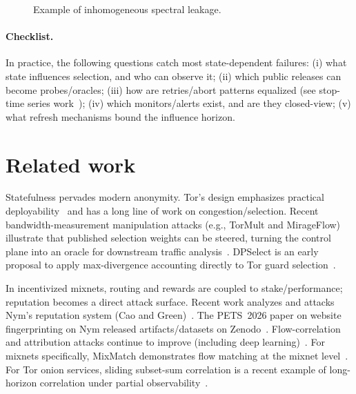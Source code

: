 \documentclass[11pt]{article}
\begin{document}
\begin{figure}[t]
  \centering
  \caption{Example of inhomogeneous spectral leakage.}
  \label{fig:inhom}
\end{figure}

\paragraph{Checklist.}
In practice, the following questions catch most state-dependent failures:
(i) what state influences selection, and who can observe it;
(ii) which public releases can become probes/oracles;
(iii) how are retries/abort patterns equalized (see stop-time series work~\cite{series:stoptimeaddendum});
(iv) which monitors/alerts exist, and are they closed-view;
(v) what refresh mechanisms bound the influence horizon.


\section{Related work}
Statefulness pervades modern anonymity.
Tor's design emphasizes practical deployability~\cite{dingledine2004tor} and has a long line of work on congestion/selection.
Recent bandwidth-measurement manipulation attacks (e.g., TorMult and MirageFlow) illustrate that published selection weights can be steered, turning the control plane into an oracle for downstream traffic analysis~\cite{Sendner2023TorMult,Sendner2024MirageFlow}.
DPSelect is an early proposal to apply max-divergence accounting directly to Tor guard selection~\cite{Hanley2019DPSelect}.

In incentivized mixnets, routing and rewards are coupled to stake/performance; reputation becomes a direct attack surface.
Recent work analyzes and attacks Nym's reputation system (Cao and Green)~\cite{cao2026nymrep}. The PETS~2026 paper on website fingerprinting on Nym released artifacts/datasets on Zenodo~\cite{jolles2025wf4nym_zenodo}.
Flow-correlation and attribution attacks continue to improve (including deep learning)~\cite{nasr2018deepcorr,oh2022deepcoffea,singh2025revealnet}.
For mixnets specifically, MixMatch demonstrates flow matching at the mixnet level~\cite{oldenburg2024mixmatch}.
For Tor onion services, sliding subset-sum correlation is a recent example of long-horizon correlation under partial observability~\cite{lopes2024sumo}.
\end{document}
